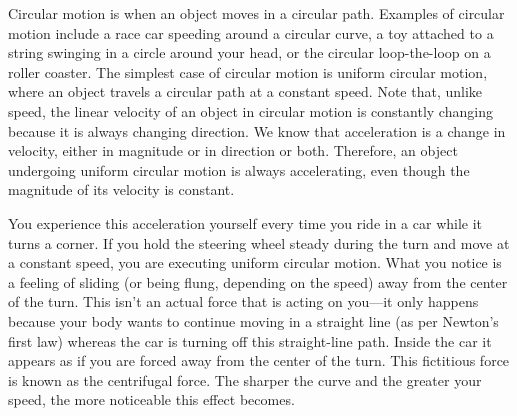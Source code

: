 \documentclass[main-physics.tex]{subfiles}
\begin{document}
Circular motion is when an object moves in a circular path. Examples of circular motion include a race car speeding around a circular curve, a toy attached to a string swinging in a circle around your head, or the circular loop-the-loop on a roller coaster. The simplest case of circular motion is \gls{uniform circular motion}, where an object travels a circular path at a constant speed. Note that, unlike speed, the linear velocity of an object in circular motion is constantly changing because it is always changing direction. We know that acceleration is a change in velocity, either in magnitude or in direction or both. Therefore, an object undergoing uniform circular motion is always accelerating, even though the magnitude of its velocity is constant.

\vspace{1em}

You experience this acceleration yourself every time you ride in a car while it turns a corner. If you hold the steering wheel steady during the turn and move at a constant speed, you are executing uniform circular motion. What you notice is a feeling of sliding (or being flung, depending on the speed) away from the center of the turn. This isn't an actual force that is acting on you---it only happens because your body wants to continue moving in a straight line (as per Newton's first law) whereas the car is turning off this straight-line path. Inside the car it appears as if you are forced away from the center of the turn. This fictitious force is known as the \gls{centrifugal force}. The sharper the curve and the greater your speed, the more noticeable this effect becomes.

\begin{center}
\captionsetup{type=figure,margin=1in,font=scriptsize}
\label{4QmpMJ}
\end{center}
\end{document}
